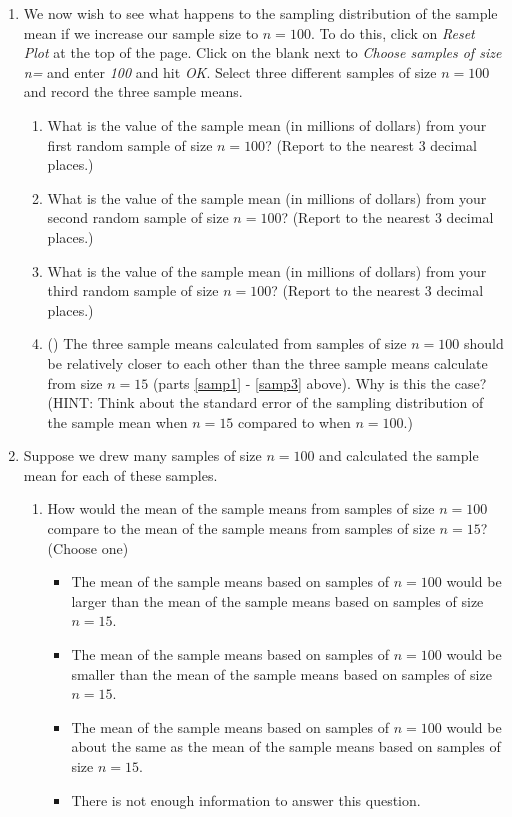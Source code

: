 \begin{enumerate}
\item We now wish to see what happens to the sampling distribution of the sample mean if we increase our sample size to $n=100$.  To do this, click on \textit{Reset Plot} at the top of the page.  Click on the blank next to \textit{Choose samples of size n=} and enter \textit{100} and hit \textit{OK}.  Select three different samples of size $n=100$ and record the three sample means.
\begin{enumerate}
\item What is the value of the sample mean (in millions of dollars) from your first random sample of size $n=100$?  (Report to the nearest 3 decimal places.)
\item What is the value of the sample mean (in millions of dollars) from your second random sample of size $n=100$?  (Report to the nearest 3 decimal places.)
\item What is the value of the sample mean (in millions of dollars) from your third random sample of size $n=100$?  (Report to the nearest 3 decimal places.)
\item  (\textbf{})  The three sample means calculated from samples of size $n=100$ should be relatively closer to each other than the three sample means calculate from size $n=15$ (parts \ref{samp1} - \ref{samp3} above).  Why is this the case?  (HINT:  Think about the standard error of the sampling distribution of the sample mean when $n=15$ compared to when $n=100$.)\\
\end{enumerate}



\item Suppose we drew many samples of size $n=100$ and calculated the sample mean for each of these samples.  
\begin{enumerate}
\item How would the mean of the sample means from samples of size $n=100$ compare to the mean of the sample means from samples of size $n=15$?  (Choose one)
	\begin{itemize}
	\item The mean of the sample means based on samples of $n=100$ would be larger than the mean of the sample means based on samples of size $n=15$.
	\item  The mean of the sample means based on samples of $n=100$ would be smaller than the mean of the sample means based on samples of size $n=15$.
	\item The mean of the sample means based on samples of $n=100$ would be about the same as the mean of the sample means based on samples of size $n=15$.
	\item There is not enough information to answer this question.\\
	\end{itemize}


\end{enumerate}
\end{enumerate}
